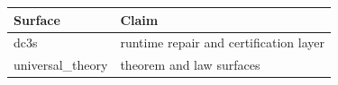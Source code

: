 \begin{tabular}{ll}Surface & Claim\\\midrule dc3s & runtime repair and certification layer\\ universal\_theory & theorem and law surfaces\\\end{tabular}
